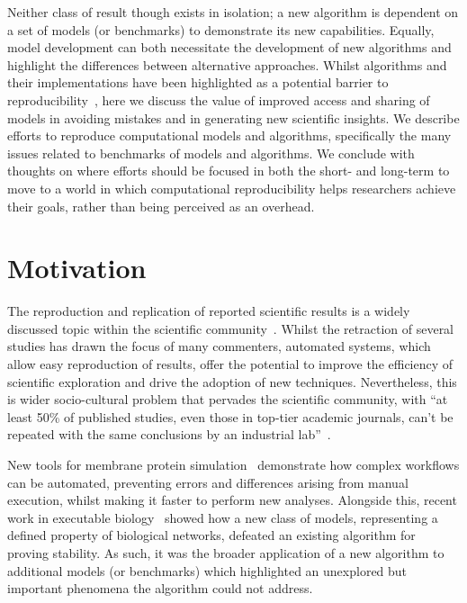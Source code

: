 \documentclass[conference]{IEEEtran}
\begin{document}
Neither class of result though exists in isolation; a new algorithm is
dependent on a set of models (or benchmarks) to demonstrate its new
capabilities. Equally, model development can both necessitate the
development of new algorithms and highlight the differences between
alternative approaches. Whilst algorithms and their implementations
have been highlighted as a potential barrier to
reproducibility~\cite{crick-et-al_wssspe2}, here we discuss the value
of improved access and sharing of models in avoiding mistakes and in
generating new scientific insights. We describe efforts to reproduce
computational models and algorithms, specifically the many issues
related to benchmarks of models and algorithms. We conclude with
thoughts on where efforts should be focused in both the short- and
long-term to move to a world in which computational reproducibility
helps researchers achieve their goals, rather than being perceived as
an overhead.


\section{Motivation}
The reproduction and replication of reported scientific results is a
widely discussed topic within the scientific
community~\cite{barnes:2010,morin-et-al:2012,joppa-et-al:2013}.
Whilst the retraction of several studies has drawn the focus of many
commenters, automated systems, which allow easy reproduction of
results, offer the potential to improve the efficiency of scientific
exploration and drive the adoption of new techniques. Nevertheless,
this is wider socio-cultural problem that pervades the scientific
community, with ``at least 50\% of published studies, even those in
top-tier academic journals, can't be repeated with the same
conclusions by an industrial lab''~\cite{osherovich:2011}.

New tools for membrane protein simulation~\cite{Stansfeld,Hall2014}
demonstrate how complex workflows can be automated, preventing errors
and differences arising from manual execution, whilst making it faster
to perform new analyses.  Alongside this, recent work in executable
biology~\cite{Cook} showed how a new class of models, representing a
defined property of biological networks, defeated an existing
algorithm for proving stability. As such, it was the broader
application of a new algorithm to additional models (or benchmarks)
which highlighted an unexplored but important phenomena the algorithm
could not address.
\end{document}
